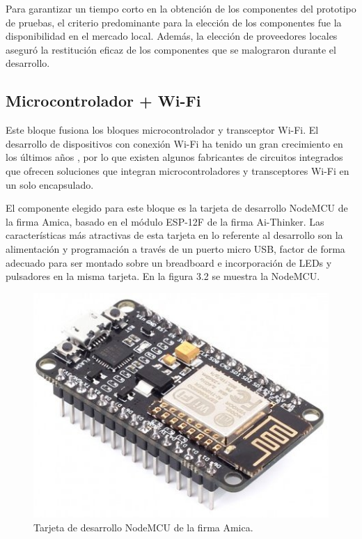 Para garantizar un tiempo corto en la obtención de los componentes del prototipo de pruebas, el criterio predominante para la elección de los componentes fue la disponibilidad en el mercado local. Además, la elección de proveedores locales aseguró la restitución eficaz de los componentes que se malograron durante el desarrollo.

\subsection{Microcontrolador + Wi-Fi}

Este bloque fusiona los bloques microcontrolador y transceptor Wi-Fi. El desarrollo de dispositivos con conexión Wi-Fi ha tenido un gran crecimiento en los últimos años \citep{WEBSITE:19}, por lo que existen algunos fabricantes de circuitos integrados que ofrecen soluciones que integran microcontroladores y transceptores Wi-Fi en un solo encapsulado.

El componente elegido para este bloque es la tarjeta de desarrollo NodeMCU de la firma Amica, basado en el módulo ESP-12F de la firma Ai-Thinker. Las características más atractivas de esta tarjeta en lo referente al desarrollo son la alimentación y programación a través de un puerto micro USB, factor de forma adecuado para ser montado sobre un breadboard e incorporación de LEDs y pulsadores en la misma tarjeta. En la figura 3.2 se muestra la NodeMCU.

\begin{figure}[h]
	\centering
	\includegraphics[scale=0.4]{./Figures/nodemcu.jpg}
	\caption{Tarjeta de desarrollo NodeMCU de la firma Amica\protect\footnotemark.}
		\label{fig:nodemcu}
	\end{figure}

